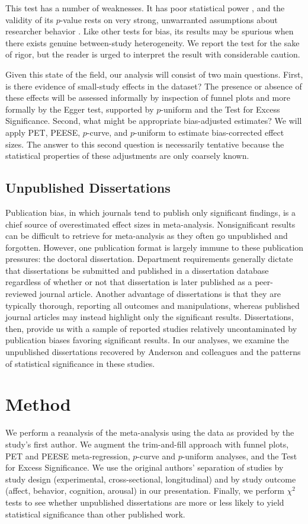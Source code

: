 \documentclass[man, mask]{apa6}
\begin{document}
This test has a number of weaknesses. It has poor statistical power \citep{Ioannidis:Trikalinos:2007}, and the validity of its $p$-value rests on very strong, unwarranted assumptions about researcher behavior \citep{Morey:2013}. Like other tests for bias, its results may be spurious when there exists genuine between-study heterogeneity. We report the test for the sake of rigor, but the reader is urged to interpret the result with considerable caution.

Given this state of the field, our analysis will consist of two main questions.  First, is there evidence of small-study effects in the dataset?  The presence or absence of these effects will be assessed informally by inspection of funnel plots and more formally by the Egger test, supported by $p$-uniform and the Test for Excess Significance.  Second, what might be appropriate bias-adjusted estimates?  We will apply PET, PEESE, $p$-curve, and $p$-uniform to estimate bias-corrected effect sizes.  The answer to this second question is necessarily tentative because the statistical properties of these adjustments are only coarsely known.

\subsection{Unpublished Dissertations}
Publication bias, in which journals tend to publish only significant findings, is a chief source of overestimated effect sizes in meta-analysis. Nonsignificant results can be difficult to retrieve for meta-analysis as they often go unpublished and forgotten. However, one publication format is largely immune to these publication pressures: the doctoral dissertation. Department requirements generally dictate that dissertations be submitted and published in a dissertation database regardless of whether or not that dissertation is later published as a peer-reviewed journal article.  Another advantage of dissertations is that they are typically thorough, reporting all outcomes and manipulations, whereas published journal articles may instead highlight only the significant results.  Dissertations, then, provide us with a sample of reported studies relatively uncontaminated by publication biases favoring significant results. In our analyses, we examine the unpublished  dissertations recovered by Anderson and colleagues and the patterns of statistical significance in these studies.

\section{Method}
We perform a reanalysis of the \citet{Anderson:etal:2010} meta-analysis using the data as provided by the study's first author.  We augment the trim-and-fill approach with funnel plots, PET and PEESE meta-regression, $p$-curve and $p$-uniform analyses, and the Test for Excess Significance. We use the original authors' separation of studies by study design (experimental, cross-sectional, longitudinal) and by study outcome (affect, behavior, cognition, arousal) in our presentation. Finally, we perform $\chi^2$ tests to see whether unpublished dissertations are more or less likely to yield statistical significance than other published work.
\end{document}
